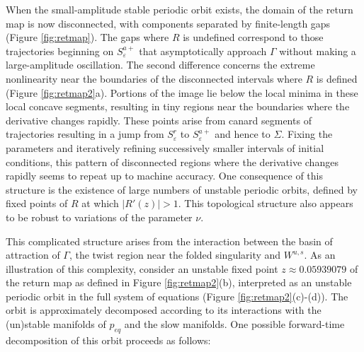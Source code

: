 \documentclass[aip, cha, sd, amsmath,amssymb, preprint]{revtex4-1}
\begin{document}
When the small-amplitude stable periodic orbit exists, the domain of the return map is now disconnected, with components separated by finite-length gaps (Figure \ref{fig:retmap}). The gaps where $R$ is undefined correspond to those trajectories beginning on $S^{a+}_{ \varepsilon}$ that asymptotically approach $\Gamma$ without making a large-amplitude oscillation.  The second difference concerns the extreme nonlinearity near the boundaries of the disconnected intervals where $R$ is defined (Figure \ref{fig:retmap2}a). Portions of the image lie below the local minima in these local concave segments, resulting in tiny regions near the boundaries where the derivative changes rapidly. These points arise from canard segments of trajectories resulting in a jump from $S^r_{ \varepsilon}$ to $S^{a+}_{ \varepsilon}$ and hence to $\Sigma$.  Fixing the parameters and iteratively refining successively smaller intervals of initial conditions, this pattern of disconnected regions where the derivative changes rapidly seems to repeat up to machine accuracy. One consequence of this structure is the existence of large numbers of unstable periodic orbits, defined by fixed points of $R$ at which $|R'(z)| > 1$. This topological structure also appears to be robust to variations of the parameter $\nu$. 

This complicated structure arises from the interaction between the basin of attraction of $\Gamma$, the twist region near the folded singularity and $W^{u,s}$. As an illustration of this complexity, consider an unstable fixed point $z \approx  0.05939079$ of the return map as defined in Figure \ref{fig:retmap2}(b), interpreted as an unstable periodic orbit in the full system of equations (Figure \ref{fig:retmap2}(c)-(d)). The orbit is approximately decomposed according to its interactions with the (un)stable manifolds of $p_{eq}$ and the slow manifolds. One possible forward-time decomposition of this orbit proceeds as follows:
\end{document}

